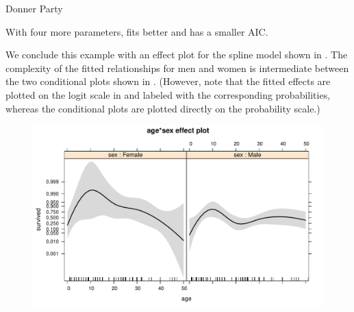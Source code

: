 \documentclass[11pt]{book}
\renewenvironment{knitrout}{\small\renewcommand{\baselinestretch}{.85}}{} %
\begin{document}
\begin{Example}[donner1]{Donner Party}
\begin{knitrout}
\begin{kframe}
{\ttfamily\noindent\bfseries\color{errorcolor}{\#\# Error: length(rows) == 1 is not TRUE}}\end{kframe}
\end{knitrout}
With four more parameters,  fits better and has
a smaller AIC.

We conclude this example with an effect plot for the spline model 
 shown in .
The complexity of the fitted relationships for men and women
is intermediate between the two conditional plots shown in 
.  (However, note that the fitted effects are
plotted on the logit scale in  and labeled
with the corresponding probabilities, whereas the conditional plots
are plotted directly on the probability scale.)


\begin{knitrout}
\color{fgcolor}\begin{kframe}
\begin{alltt}
 \hlkwb{<-}  \hlstd{=}\hlstd{(}\hlstd{=}\hlstd{(}\hlstd{,}\hlstd{,}\hlstd{)))}
 \hlstd{=}\hlstd{(}\hlstd{=}\hlstd{(}\hlstd{,} \hlstd{,} \hlstd{,} \hlstd{,} \hlstd{,}
                                  \hlstd{,} \hlstd{,} \hlstd{,} \hlstd{,} \hlstd{,} \hlstd{)))}
\end{alltt}
\end{kframe}\begin{figure}[!htbp]


\centerline{\includegraphics[width=.8\textwidth]{ch07/fig/donner-effect} }


\end{figure}
\end{knitrout}
\end{Example}
\end{document}
